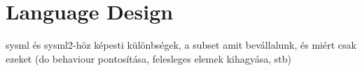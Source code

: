 \section{Language Design}

sysml és sysml2-höz képesti különbségek, a subset amit bevállalunk, és miért csak ezeket (do behaviour pontosítása, felesleges elemek kihagyása, stb)